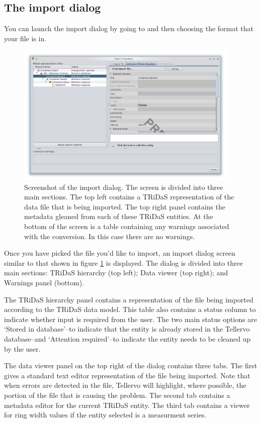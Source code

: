 \subsection{The import dialog}
You can launch the import dialog by going to  and then choosing the format that your file is in. 

\begin{figure}[htbp]
  \centering
    \includegraphics[width=0.95\textwidth]{Images/importdata1.png}
    \caption{Screenshot of the import dialog.  The screen is divided into three main sections.  The top left contains a TRiDaS representation of the data file that is being imported.  The top right panel contains the metadata gleaned from each of these TRiDaS entities.  At the bottom of the screen is a table containing any warnings associated with the conversion.  In this case there are no warnings. }
    \label{fig:import}
\end{figure}

Once you have picked the file you'd like to import, an import dialog screen similar to that shown in figure \ref{fig:import} is displayed. The dialog is divided into three main sections: TRiDaS hierarchy (top left); Data viewer (top right); and Warnings panel (bottom).   

The TRiDaS hierarchy panel contains a representation of the file being imported according to the TRiDaS data model.  This table also contains a status column to indicate whether input is required from the user.  The two main status options are `Stored in database'--to indicate that the entity is already stored in the Tellervo database--and `Attention required'--to indicate the entity needs to be cleaned up by the user.  

The data viewer panel on the top right of the dialog contains three tabs.  The first gives a standard text editor representation of the file being imported.  Note that when errors are detected in the file, Tellervo will highlight, where possible, the portion of the file that is causing the problem.  The second tab contains a metadata editor for the current TRiDaS entity.  The third tab contains a viewer for ring width values if the entity selected is a measurment series.

